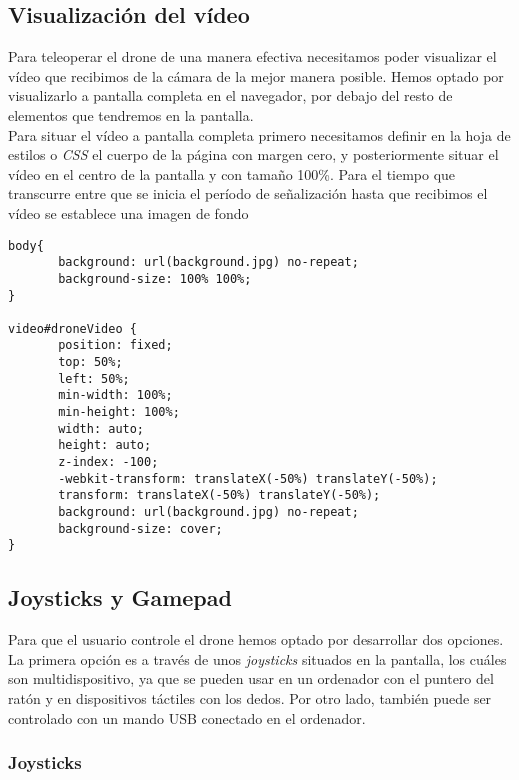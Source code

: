 \subsection{Visualización del vídeo}

Para teleoperar el drone de una manera efectiva necesitamos poder visualizar el vídeo que recibimos de la cámara de la mejor manera posible. Hemos optado por visualizarlo a pantalla completa en el navegador, por debajo del resto de elementos que tendremos en la pantalla.\\

Para situar el vídeo a pantalla completa primero necesitamos definir en la hoja de estilos o \emph{CSS} el cuerpo de la página con margen cero, y posteriormente situar el vídeo en el centro de la pantalla y con tamaño 100\%. Para el tiempo que transcurre entre que se inicia el período de señalización hasta que recibimos el vídeo se establece una imagen de fondo\\

\begin{lstlisting}[caption=Vídeo a pantalla completa.]
body{
       background: url(background.jpg) no-repeat;
       background-size: 100% 100%;
}

video#droneVideo { 
       position: fixed;
       top: 50%;
       left: 50%;
       min-width: 100%;
       min-height: 100%;
       width: auto;
       height: auto;
       z-index: -100;
       -webkit-transform: translateX(-50%) translateY(-50%);
       transform: translateX(-50%) translateY(-50%);
       background: url(background.jpg) no-repeat;
       background-size: cover; 
}
\end{lstlisting}

\subsection{Joysticks y Gamepad}\label{subsec:joysticks}

Para que el usuario controle el drone hemos optado por desarrollar dos opciones. La primera opción es a través de unos \emph{joysticks} situados en la pantalla, los cuáles son multidispositivo, ya que se pueden usar en un ordenador con el puntero del ratón y en dispositivos táctiles con los dedos. Por otro lado, también puede ser controlado con un mando USB conectado en el ordenador.\\

\subsubsection{Joysticks}

